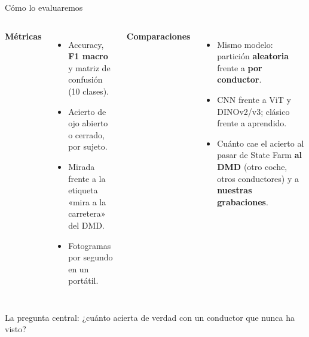 \documentclass[aspectratio=169,9pt,t,xcolor={table}]{beamer}
\begin{document}
\begin{frame}{Cómo lo evaluaremos}
\vspace{1mm}
\begin{columns}[T,onlytextwidth]
\textbf{Métricas}
\vspace{1.5mm}
\begin{itemize}\setlength{\itemsep}{1.4mm}
  \item Accuracy, \textbf{F1 macro} y matriz de confusión (10 clases).
  \item Acierto de ojo abierto o cerrado, por sujeto.
  \item Mirada frente a la etiqueta «mira a la carretera» del DMD.
  \item Fotogramas por segundo en un portátil.
\end{itemize}
\textbf{Comparaciones}
\vspace{1.5mm}
\begin{itemize}\setlength{\itemsep}{1.4mm}
  \item Mismo modelo: partición \textbf{aleatoria} frente a \textbf{por conductor}.
  \item CNN frente a ViT y DINOv2/v3; clásico frente a aprendido.
  \item Cuánto cae el acierto al pasar de State Farm \textbf{al DMD} (otro coche, otros
        conductores) y a \textbf{nuestras grabaciones}.
\end{itemize}
\end{columns}

\vspace{6mm}
\begin{clave}
\color{marino}La pregunta central: ¿cuánto acierta de verdad con un conductor que nunca ha visto?
\end{clave}
\end{frame}
\end{document}
